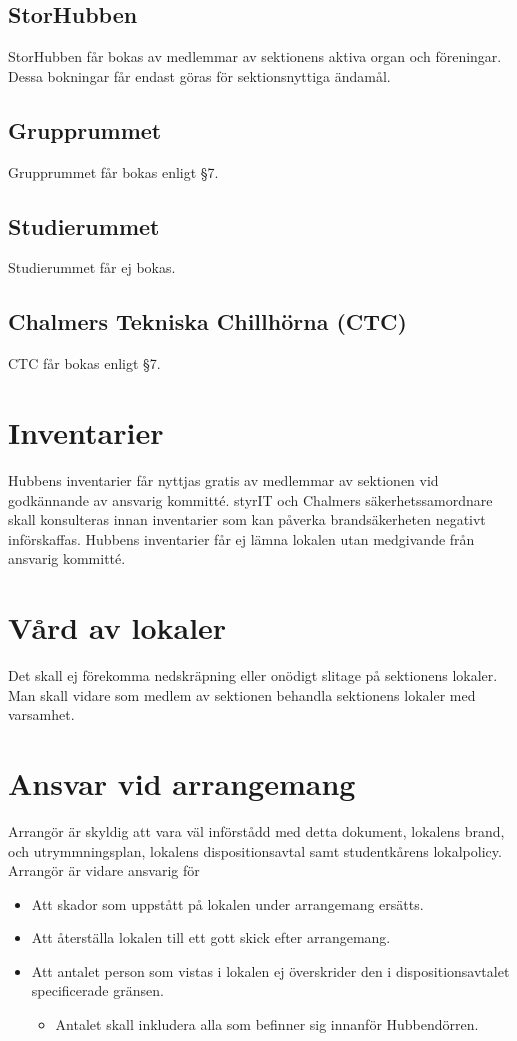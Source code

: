\documentclass[11pt, includeaddress]{classes/cthit}
\begin{document}
\subsection{StorHubben}
StorHubben får bokas av medlemmar av sektionens aktiva organ och föreningar.
Dessa bokningar får endast göras för sektionsnyttiga ändamål.

\subsection{Grupprummet}
Grupprummet får bokas enligt §7.

\subsection{Studierummet}
Studierummet får ej bokas.

\subsection{Chalmers Tekniska Chillhörna (CTC)}
CTC får bokas enligt §7.


\section{Inventarier}
Hubbens inventarier får nyttjas gratis av medlemmar av sektionen vid godkännande av ansvarig kommitté. styrIT och Chalmers säkerhetssamordnare skall
konsulteras innan inventarier som kan påverka brandsäkerheten negativt införskaffas. Hubbens inventarier får ej lämna lokalen utan medgivande från
ansvarig kommitté.



\section{Vård av lokaler}
Det skall ej förekomma nedskräpning eller onödigt slitage på sektionens lokaler.
Man skall vidare som medlem av sektionen behandla sektionens lokaler med varsamhet.

\section{Ansvar vid arrangemang}
Arrangör är skyldig att vara väl införstådd med detta dokument, lokalens brand­, och
utrymmningsplan, lokalens dispositionsavtal samt studentkårens lokalpolicy.
Arrangör är vidare ansvarig för
\begin{itemize}
	\item Att skador som uppstått på lokalen under arrangemang ersätts.
	\item Att återställa lokalen till ett gott skick efter arrangemang.
	\item Att antalet person som vistas i lokalen ej överskrider den i dispositionsavtalet specificerade
	gränsen.
	\begin{itemize}
	\item Antalet skall inkludera alla som befinner sig innanför Hubben­dörren.
	\end{itemize}
\end{itemize}
\end{document}
